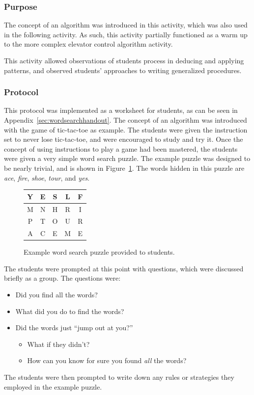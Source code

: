 	\subsubsection{Purpose}
	
	The concept of an algorithm was introduced in this activity, which
	was also used in the following activity. As such, this activity partially functioned as a warm up to the more complex elevator
	control algorithm activity. 
	
	This activity allowed observations of students process in deducing
	and applying patterns, and observed students' approaches to writing
	generalized procedures.
	
	
	\subsubsection{Protocol}
	
	This protocol was implemented as a worksheet for students, as can
	be seen in Appendix~\ref{sec:wordsearchhandout}. The concept of an
	algorithm was introduced with the game of tic-tac-toe as example.
	The students were given the instruction set to never lose tic-tac-toe,
	and were encouraged to study and try it. Once the concept of using
	instructions to play a game had been mastered, the students were
	given a very simple word search puzzle. The example puzzle was
	designed to be nearly trivial, and is shown in Figure~\ref{fig:Example-word-search}.
	The words hidden in this puzzle are \emph{ace}, \emph{fire}, \emph{shoe},
	\emph{tour}, and \emph{yes}.
	
	
	\begin{figure}
	\begin{centering}
	\begin{tabular}{|c|c|c|c|c|}
	\hline 
	Y & E & S & L & F\tabularnewline
	\hline
	\hline 
	M & N & H & R & I\tabularnewline
	\hline
	\hline 
	P & T & O & U & R\tabularnewline
	\hline
	\hline 
	A & C & E & M & E\tabularnewline
	\hline
	\end{tabular}
	\par\end{centering}
	
	\caption{Example word search puzzle provided to students.}
	\label{fig:Example-word-search}
	\end{figure}
	
	The students were prompted at this point with questions, which
	were discussed briefly as a group. The questions were:
	\begin{itemize}
	\item Did you find all the words?
	\item What did you do to find the words?
	\item Did the words just ``jump out at you?'' 
	
	\begin{itemize}
	\item What if they didn't?
	\item How can you know for sure you found \emph{all} the words?
	\end{itemize}
	\end{itemize}
	The students were then prompted to write down any rules or strategies
	they employed in the example puzzle. 
	
